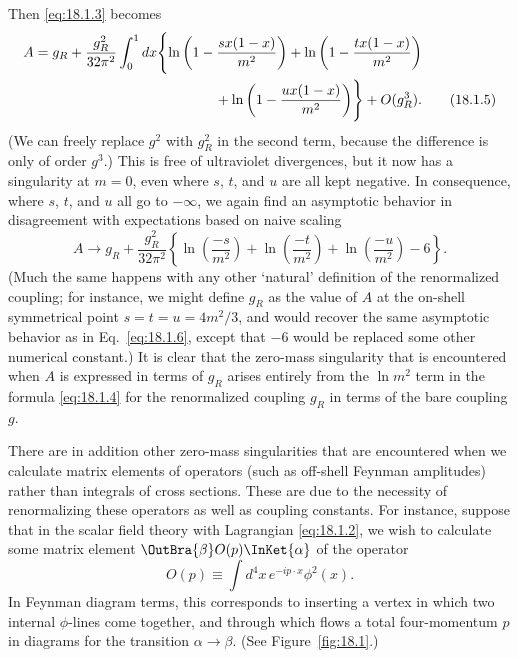 Then \eqref{eq:18.1.3} becomes
\begin{align}
 A={}&g_R+\frac{g_R^2}{32\pi^2}\int_0^1dx\Biggl\{
 \ln\left(1-\frac{sx(1-x)}{m^2}\right)
 +\ln\left(1-\frac{tx(1-x)}{m^2}\right) \notag\\
 &\hspace{41mm}
 +\ln\left(1-\frac{ux(1-x)}{m^2}\right)\Biggr\}+O(g_R^3) .
 \tag{18.1.5}
 \label{eq:18.1.5}
\end{align}
(We can freely replace $g^2$ with $g_R^2$ in the second term, because the
difference is only of order $g^3$.) This is free of ultraviolet divergences,
but it now has a singularity at $m=0$, even where $s$, $t$, and $u$ are all
kept negative. In consequence, where $s$, $t$, and $u$ all go to $-\infty$,
we again find an asymptotic behavior in disagreement with expectations based
on naive scaling
\begin{equation}
 A\longrightarrow g_R+\frac{g_R^2}{32\pi^2}
 \left\{\ln\left(\frac{-s}{m^2}\right)
 +\ln\left(\frac{-t}{m^2}\right)
 +\ln\left(\frac{-u}{m^2}\right)-6\right\} .
 \tag{18.1.6}
 \label{eq:18.1.6}
\end{equation}
(Much the same happens with any other `natural' definition of the
renormalized coupling; for instance, we might define $g_R$ as the value of
$A$ at the on-shell symmetrical point $s=t=u=4m^2/3$, and would recover the
same asymptotic behavior as in Eq.~\eqref{eq:18.1.6}, except that $-6$ would
be replaced some other numerical constant.) It is clear that the zero-mass
singularity that is encountered when $A$ is expressed in terms of $g_R$
arises entirely from the $\ln m^2$ term in the formula \eqref{eq:18.1.4} for
the renormalized coupling $g_R$ in terms of the bare coupling $g$.

There are in addition other zero-mass singularities that are encountered when
we calculate matrix elements of operators (such as off-shell Feynman
amplitudes) rather than integrals of cross sections. These are due to the
necessity of renormalizing these operators as well as coupling constants. For
instance, suppose that in the scalar field theory with Lagrangian
\eqref{eq:18.1.2}, we wish to calculate some matrix element
$\OutBra{\beta}O(p)\InKet{\alpha}$ of the operator
\begin{equation}
 O(p)\equiv\int d^4x\,e^{-ip\cdot x}\phi^2(x) .
 \tag{18.1.7}
 \label{eq:18.1.7}
\end{equation}
In Feynman diagram terms, this corresponds to inserting a vertex in which two
internal $\phi$-lines come together, and through which flows a total
four-momentum $p$ in diagrams for the transition $\alpha\to\beta$. (See
Figure~\ref{fig:18.1}.)


